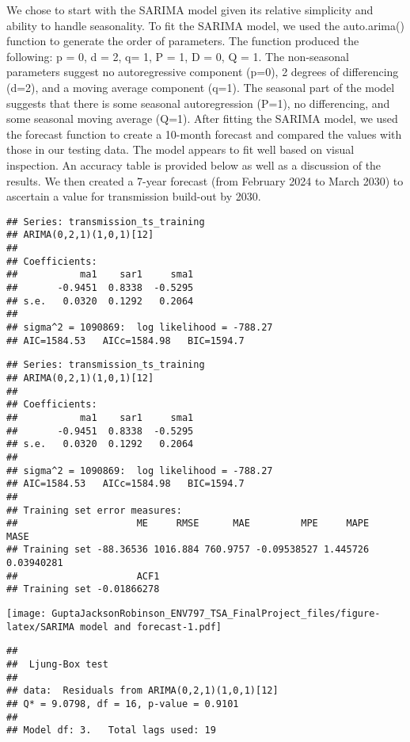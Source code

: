 \documentclass[
]{article}
\begin{document}
We chose to start with the SARIMA model given its relative simplicity
and ability to handle seasonality. To fit the SARIMA model, we used the
auto.arima() function to generate the order of parameters. The function
produced the following: p = 0, d = 2, q= 1, P = 1, D = 0, Q = 1. The
non-seasonal parameters suggest no autoregressive component (p=0), 2
degrees of differencing (d=2), and a moving average component (q=1). The
seasonal part of the model suggests that there is some seasonal
autoregression (P=1), no differencing, and some seasonal moving average
(Q=1). After fitting the SARIMA model, we used the forecast function to
create a 10-month forecast and compared the values with those in our
testing data. The model appears to fit well based on visual inspection.
An accuracy table is provided below as well as a discussion of the
results. We then created a 7-year forecast (from February 2024 to March
2030) to ascertain a value for transmission build-out by 2030.

\begin{verbatim}
## Series: transmission_ts_training 
## ARIMA(0,2,1)(1,0,1)[12] 
## 
## Coefficients:
##           ma1    sar1     sma1
##       -0.9451  0.8338  -0.5295
## s.e.   0.0320  0.1292   0.2064
## 
## sigma^2 = 1090869:  log likelihood = -788.27
## AIC=1584.53   AICc=1584.98   BIC=1594.7
\end{verbatim}

\begin{verbatim}
## Series: transmission_ts_training 
## ARIMA(0,2,1)(1,0,1)[12] 
## 
## Coefficients:
##           ma1    sar1     sma1
##       -0.9451  0.8338  -0.5295
## s.e.   0.0320  0.1292   0.2064
## 
## sigma^2 = 1090869:  log likelihood = -788.27
## AIC=1584.53   AICc=1584.98   BIC=1594.7
## 
## Training set error measures:
##                     ME     RMSE      MAE         MPE     MAPE       MASE
## Training set -88.36536 1016.884 760.9757 -0.09538527 1.445726 0.03940281
##                     ACF1
## Training set -0.01866278
\end{verbatim}

\texttt{[image: GuptaJacksonRobinson\_ENV797\_TSA\_FinalProject\_files/figure-latex/SARIMA model and forecast-1.pdf]}

\begin{verbatim}
## 
##  Ljung-Box test
## 
## data:  Residuals from ARIMA(0,2,1)(1,0,1)[12]
## Q* = 9.0798, df = 16, p-value = 0.9101
## 
## Model df: 3.   Total lags used: 19
\end{verbatim}
\end{document}

